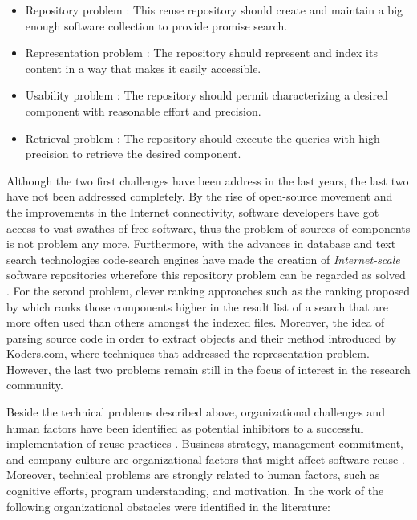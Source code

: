 \begin{itemize}
\item Repository problem \cite{Seacord1999}: This reuse repository should create and maintain a big enough software collection to provide promise search.
\item Representation problem \cite{Pole1994}: The repository should represent and index its content in a way that makes it easily accessible.
\item Usability problem \cite{Garcia2006}: The repository should permit characterizing a desired component with reasonable effort and precision.
\item Retrieval problem \cite{Prieto-Diaz1987}: The repository should execute the queries with high precision to retrieve the desired component.
\end{itemize}

Although the two first challenges have been address in the last years, the last two have not been addressed completely. By the rise of open-source movement and the improvements in the Internet connectivity, software developers have got access to vast swathes of free software, thus the problem of sources of components is not problem any more. Furthermore, with the advances in database and text search technologies code-search engines have made the creation of \textit{Internet-scale} software repositories wherefore this repository problem can be regarded as solved \cite{Hummel2013}. For the second problem, clever ranking approaches such as the ranking proposed by \cite{Inoue2005} which ranks those components higher in the result list of a search that are more often used than others amongst the indexed files. Moreover, the idea of parsing source code in order to extract objects and their method introduced by Koders.com, where techniques that addressed the representation problem. However, the last two problems remain still in the focus of interest in the research community.

Beside the technical problems described above, organizational challenges and human factors have been identified as potential inhibitors to a successful implementation of reuse practices \cite{Morisio2002}. Business strategy, management commitment, and company culture are organizational factors that might affect software reuse \cite{Standish1984}. Moreover, technical problems are strongly related to human factors, such as cognitive efforts, program understanding, and motivation. In the work of \cite{Bauer2016} the following organizational obstacles were identified in the literature:

